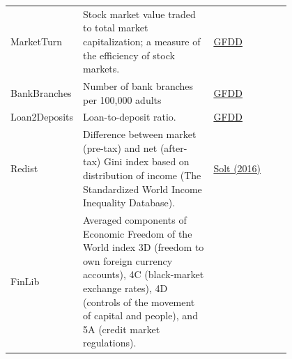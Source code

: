 \documentclass[preprint, nonatbib, 10pt]{elsarticle}
\begin{document}
\begin{center}
\begin{longtable}{l p{0.50\linewidth} p{0.3\linewidth}}
  MarketTurn & Stock market value traded to total market capitalization; a measure of the efficiency of stock markets. & \href{http://data.worldbank.org/data-catalog/global-financial-development}{GFDD} \\
  BankBranches & Number of bank branches per 100,000 adults & \href{http://data.worldbank.org/data-catalog/global-financial-development}{GFDD} \\
  Loan2Deposits & Loan-to-deposit ratio. & \href{http://data.worldbank.org/data-catalog/global-financial-development}{GFDD} \\
  Redist & Difference between market (pre-tax) and net (after-tax) Gini index based on distribution of income  (The Standardized World Income Inequality Database). & \href{http://fsolt.org/swiid/}{Solt (2016)} \\	
  FinLib & Averaged components of Economic Freedom of the World index 3D (freedom to own foreign currency accounts), 4C (black-market exchange rates), 4D (controls of the movement of capital and people), and 5A (credit market regulations). & \href{https://www.fraserinstitute.org/economic-freedom/dataset}{\textcite{gwartney2017}} \\
  \bottomrule
\end{longtable}
\end{center}
\end{document}
